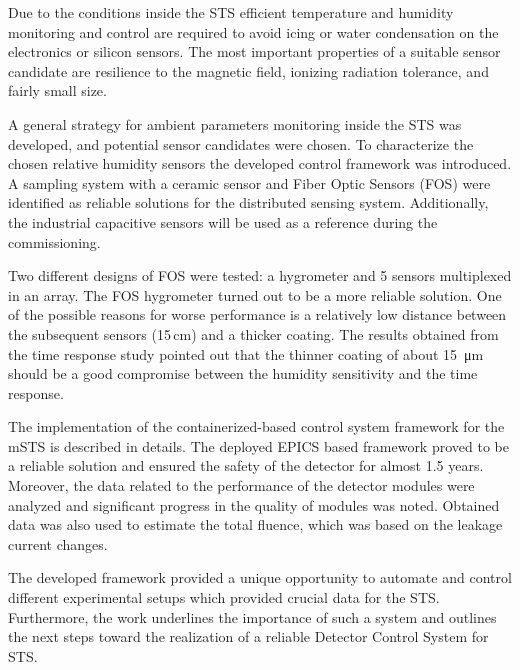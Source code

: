 Due to the conditions inside the \gls{STS} efficient temperature and humidity monitoring and control are required to avoid icing or water condensation on the electronics or silicon sensors. The most important properties of a suitable sensor candidate are resilience to the magnetic field, ionizing radiation tolerance, and fairly small size.

A general strategy for ambient parameters monitoring inside the \gls{STS} was developed, and potential sensor candidates were chosen. To characterize the chosen relative humidity sensors the developed control framework was introduced. A sampling system with a ceramic sensor and Fiber Optic Sensors (\gls{FOS}) were identified as reliable solutions for the distributed sensing system. Additionally, the industrial capacitive sensors will be used as a reference during the commissioning.

Two different designs of \gls{FOS} were tested: a hygrometer and 5 sensors multiplexed in an array. The \gls{FOS} hygrometer turned out to be a more reliable solution. One of the possible reasons for worse performance is a relatively low distance between the subsequent sensors (15\,cm) and a thicker coating. The results obtained from the time response study pointed out that the thinner coating of about \SI{15}{\micro\metre} should be a good compromise between the humidity sensitivity and the time response. 

The implementation of the containerized-based control system framework for the \gls{mSTS} is described in details. The deployed EPICS based framework proved to be a reliable solution and ensured the safety of the detector for almost 1.5 years. Moreover, the data related to the performance of the detector modules were analyzed and significant progress in the quality of modules was noted. Obtained data was also used to estimate the total fluence, which was based on the leakage current changes. 

The developed framework provided a unique opportunity to automate and control different experimental setups which provided crucial data for the \gls{STS}. Furthermore, the work underlines the importance of such a system and outlines the next steps toward the realization of a reliable Detector Control System for \gls{STS}.